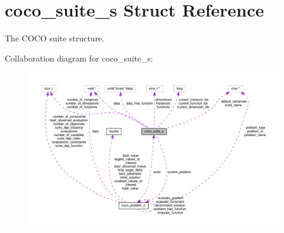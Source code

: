 \hypertarget{structcoco__suite__s}{}\section{coco\+\_\+suite\+\_\+s Struct Reference}
\label{structcoco__suite__s}


The C\+O\+CO suite structure.  




Collaboration diagram for coco\+\_\+suite\+\_\+s\+:\nopagebreak
\begin{figure}[H]
\begin{center}
\leavevmode
\includegraphics[width=350pt]{structcoco__suite__s__coll__graph}
\end{center}
\end{figure}
